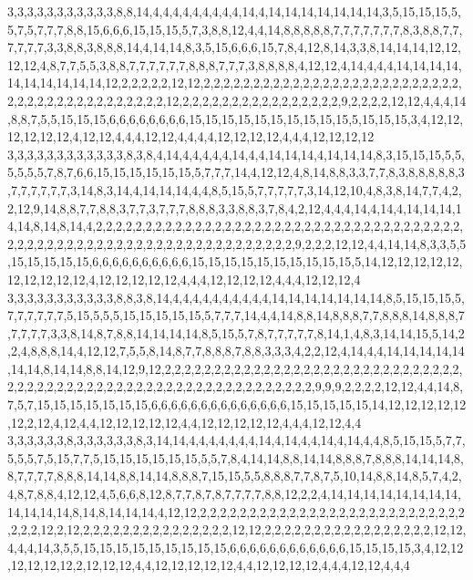3,3,3,3,3,3,3,3,3,3,3,8,8,14,4,4,4,4,4,4,4,4,4,14,4,14,14,14,14,14,14,14,3,5,15,15,15,5,5,7,5,7,7,7,8,8,15,6,6,6,15,15,15,5,7,3,8,8,12,4,4,14,8,8,8,8,8,7,7,7,7,7,7,7,8,3,8,8,7,7,7,7,7,7,3,3,8,8,3,8,8,8,14,4,14,14,8,3,5,15,6,6,6,15,7,8,4,12,8,14,3,3,8,14,14,14,12,12,12,12,4,8,7,7,5,5,3,8,8,7,7,7,7,7,7,8,8,8,7,7,7,3,8,8,8,8,4,12,12,4,14,4,4,4,14,14,14,14,14,14,14,14,14,14,12,2,2,2,2,2,12,12,2,2,2,2,2,2,2,2,2,2,2,2,2,2,2,2,2,2,2,2,2,2,2,2,2,2,2,2,2,2,2,2,2,2,2,2,2,2,2,2,2,2,12,2,2,2,2,2,2,2,2,2,2,2,2,2,2,2,2,9,2,2,2,2,12,12,4,4,4,14,8,8,7,5,5,15,15,15,6,6,6,6,6,6,6,6,15,15,15,15,15,15,15,15,15,15,5,15,15,15,3,4,12,12,12,12,12,12,4,12,12,4,4,4,12,12,4,4,4,4,12,12,12,12,4,4,4,12,12,12,12
3,3,3,3,3,3,3,3,3,3,3,3,8,3,8,4,14,4,4,4,4,4,14,4,4,14,14,14,4,14,14,14,8,3,15,15,15,5,5,5,5,5,5,7,8,7,6,6,15,15,15,15,15,15,5,7,7,7,14,4,12,12,4,8,14,8,8,3,3,7,7,8,3,8,8,8,8,8,3,7,7,7,7,7,7,3,14,8,3,14,4,14,14,14,4,4,8,5,15,5,7,7,7,7,7,3,14,12,10,4,8,3,8,14,7,7,4,2,2,12,9,14,8,8,7,7,8,8,3,7,7,3,7,7,7,8,8,8,3,3,8,8,3,7,8,4,2,12,4,4,4,14,4,14,4,14,14,14,14,14,8,14,8,14,4,2,2,2,2,2,2,2,2,2,2,2,2,2,2,2,2,2,2,2,2,2,2,2,2,2,2,2,2,2,2,2,2,2,2,2,2,2,2,2,2,2,2,2,2,2,2,2,2,2,2,2,2,2,2,2,2,2,2,2,2,2,2,2,2,2,2,9,2,2,2,12,12,4,4,14,14,8,3,3,5,5,15,15,15,15,15,6,6,6,6,6,6,6,6,6,6,15,15,15,15,15,15,15,15,15,15,5,14,12,12,12,12,12,12,12,12,12,12,4,12,12,12,12,12,4,4,4,12,12,12,12,4,4,4,12,12,12,4
3,3,3,3,3,3,3,3,3,3,3,8,8,3,8,14,4,4,4,4,4,4,4,4,4,4,14,14,14,14,14,14,14,8,5,15,15,15,5,7,7,7,7,7,7,5,15,5,5,5,15,15,15,15,15,5,7,7,7,14,4,4,14,8,8,14,8,8,8,7,7,8,8,8,14,8,8,8,7,7,7,7,7,3,3,8,14,8,7,8,8,14,14,14,14,8,5,15,5,7,8,7,7,7,7,7,8,14,1,4,8,3,14,14,15,5,14,2,2,4,8,8,8,14,4,12,12,7,5,5,8,14,8,7,7,8,8,8,7,8,8,3,3,3,4,2,2,12,4,14,4,4,14,14,14,14,14,14,14,8,14,14,8,8,14,12,9,12,2,2,2,2,2,2,2,2,2,2,2,2,2,2,2,2,2,2,2,2,2,2,2,2,2,2,2,2,2,2,2,2,2,2,2,2,2,2,2,2,2,2,2,2,2,2,2,2,2,2,2,2,2,2,2,2,2,2,2,2,2,9,9,9,2,2,2,2,12,12,4,4,14,8,7,5,7,15,15,15,15,15,15,15,6,6,6,6,6,6,6,6,6,6,6,6,6,6,15,15,15,15,15,14,12,12,12,12,12,12,2,12,4,12,4,4,12,12,12,12,12,4,4,12,12,12,12,12,4,4,4,12,12,4,4
3,3,3,3,3,3,8,3,3,3,3,3,3,8,3,14,14,4,4,4,4,4,4,4,14,4,14,4,4,14,4,14,4,4,8,5,15,15,5,7,7,5,5,5,7,5,15,7,7,5,15,15,15,15,15,15,5,5,7,8,4,14,14,8,8,14,14,8,8,8,7,8,8,8,14,14,14,8,8,7,7,7,7,8,8,8,14,14,8,8,14,14,8,8,8,7,15,15,5,5,8,8,8,7,7,8,7,5,10,14,8,8,14,8,5,7,4,2,4,8,7,8,8,4,12,12,4,5,6,6,8,12,8,7,7,8,7,8,7,7,7,7,8,8,12,2,2,4,14,14,14,14,14,14,14,14,14,14,14,14,8,14,8,14,14,14,4,12,12,2,2,2,2,2,2,2,2,2,2,2,2,2,2,2,2,2,2,2,2,2,2,2,2,2,2,2,2,2,2,12,2,12,2,2,2,2,2,2,2,2,2,2,2,2,2,2,2,12,12,2,2,2,2,2,2,2,2,2,2,2,2,2,2,2,2,2,12,12,4,4,4,14,3,5,5,15,15,15,15,15,15,15,15,15,6,6,6,6,6,6,6,6,6,6,6,6,15,15,15,15,3,4,12,12,12,12,12,12,2,12,12,12,4,4,12,12,12,12,12,4,4,12,12,12,12,4,4,4,12,12,4,4,4
